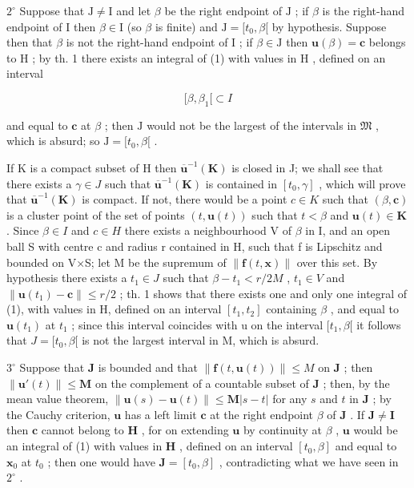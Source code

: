 \(2^{\circ}\) Suppose that \(\mathrm{J} \neq \mathrm{I}\) and let \(\beta\) be the right endpoint of \(\mathrm{J}\) ; if \(\beta\) is the right-hand endpoint of \(\mathrm{I}\) then \(\beta \in \mathrm{I}\) (so \(\beta\) is finite) and \(\mathrm{J} = [t_0, \beta[\) by hypothesis. Suppose then that \(\beta\) is not the right-hand endpoint of \(\mathrm{I}\) ; if \(\beta \in \mathrm{J}\) then \(\mathbf{u}(\beta) = \mathbf{c}\) belongs to \(\mathrm{H}\) ; by th. 1 there exists an integral of (1) with values in \(\mathrm{H}\) , defined on an interval

\[
[ \beta , \beta_ {1} [ \subset I
\]

and equal to \(\mathbf{c}\) at \(\beta\) ; then \(\mathrm{J}\) would not be the largest of the intervals in \(\mathfrak{M}\) , which is absurd; so \(\mathrm{J} = [t_0, \beta[\) .

If K is a compact subset of H then \(\overline{\mathbf{u}}^{-1}(\mathbf{K})\) is closed in J; we shall see that there exists a \(\gamma\in J\) such that \(\overline{\mathbf{u}}^{-1}(\mathbf{K})\) is contained in \([t_{0},\gamma]\) , which will prove that \(\overline{\mathbf{u}}^{-1}(\mathbf{K})\) is compact. If not, there would be a point \(c\in K\) such that \((\beta,\mathbf{c})\) is a cluster point of the set of points \((t,\mathbf{u}(t))\) such that \(t<\beta\) and \(\mathbf{u}(t)\in\mathbf{K}\) . Since \(\beta\in I\) and \(c\in H\) there exists a neighbourhood V of \(\beta\) in I, and an open ball S with centre c and radius r contained in H, such that f is Lipschitz and bounded on V×S; let M be the supremum of \(\|\mathbf{f}(t,\mathbf{x})\|\) over this set. By hypothesis there exists a \(t_{1}\in J\) such that \(\beta-t_{1}<r/2M\) , \(t_{1}\in V\) and \(\|\mathbf{u}(t_{1})-\mathbf{c}\|\leqslant r/2\) ; th. 1 shows that there exists one and only one integral of (1), with values in H, defined on an interval \([t_{1},t_{2}]\) containing \(\beta\) , and equal to \(\mathbf{u}(t_{1})\) at \(t_{1}\) ; since this interval coincides with u on the interval \([t_{1},\beta[\) it follows that \(J=[t_{0},\beta[\) is not the largest interval in M, which is absurd.

\(3^{\circ}\) Suppose that \(\mathbf{J}\) is bounded and that \(\| \mathbf{f}(t,\mathbf{u}(t))\| \leqslant M\) on \(\mathbf{J}\) ; then \(\| \mathbf{u}'(t)\| \leqslant \mathbf{M}\) on the complement of a countable subset of \(\mathbf{J}\) ; then, by the mean value theorem, \(\| \mathbf{u}(s) - \mathbf{u}(t)\| \leqslant \mathbf{M} |s - t|\) for any \(s\) and \(t\) in \(\mathbf{J}\) ; by the Cauchy criterion, \(\mathbf{u}\) has a left limit \(\mathbf{c}\) at the right endpoint \(\beta\) of \(\mathbf{J}\) . If \(\mathbf{J} \neq \mathbf{I}\) then \(\mathbf{c}\) cannot belong to \(\mathbf{H}\) , for on extending \(\mathbf{u}\) by continuity at \(\beta\) , \(\mathbf{u}\) would be an integral of (1) with values in \(\mathbf{H}\) , defined on an interval \([t_0, \beta]\) and equal to \(\mathbf{x}_0\) at \(t_0\) ; then one would have \(\mathbf{J} = [t_0, \beta]\) , contradicting what we have seen in \(2^{\circ}\) .

